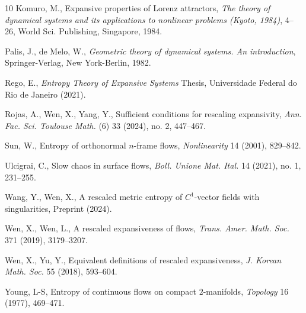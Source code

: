 \documentclass{amsart}
\numberwithin{equation}{section}
\begin{document}
\begin{thebibliography}{10}
Komuro, M.,
Expansive properties of Lorenz attractors,
{\em The theory of dynamical systems and its applications to nonlinear problems (Kyoto, 1984)}, 4–26, World Sci. Publishing, Singapore, 1984.











Palis, J., de Melo, W.,
{\em Geometric theory of dynamical systems. An introduction},
Springer-Verlag, New York-Berlin, 1982.





Rego, E.,
{\em Entropy Theory of Expansive Systems}
Thesis, Universidade Federal do Rio de Janeiro (2021).




Rojas, A., Wen, X., Yang, Y.,
Sufficient conditions for rescaling expansivity,
{\em Ann. Fac. Sci. Toulouse Math.} (6) 33 (2024), no. 2, 447--467.



Sun, W.,
Entropy of orthonormal $n$-frame flows,
{\em Nonlinearity} 14 (2001), 829--842.












Ulcigrai, C.,
Slow chaos in surface flows,
{\em Boll. Unione Mat. Ital.} 14 (2021), no. 1, 231--255.





Wang, Y., Wen, X.,
A rescaled metric entropy of $C^1$-vector fields with singularities,
Preprint (2024).

Wen, X., Wen, L.,
A rescaled expansiveness of flows,
{\em Trans. Amer. Math. Soc.} 371 (2019), 3179--3207.


Wen, X., Yu, Y.,
Equivalent definitions of rescaled expansiveness,
{\em J. Korean Math. Soc.} 55 (2018), 593--604.


Young, L-S,
Entropy of continuous flows on compact $2$-manifolds,
{\em Topology} 16 (1977), 469--471.


\end{thebibliography}
\end{document}
